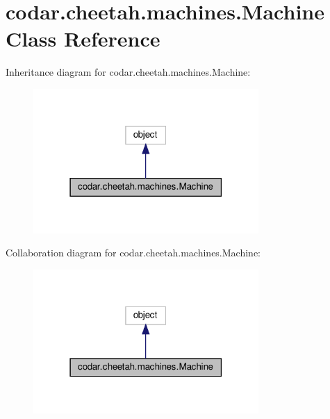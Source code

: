 \hypertarget{classcodar_1_1cheetah_1_1machines_1_1_machine}{}\section{codar.\+cheetah.\+machines.\+Machine Class Reference}
\label{classcodar_1_1cheetah_1_1machines_1_1_machine}


Inheritance diagram for codar.\+cheetah.\+machines.\+Machine\+:
\nopagebreak
\begin{figure}[H]
\begin{center}
\leavevmode
\includegraphics[width=243pt]{classcodar_1_1cheetah_1_1machines_1_1_machine__inherit__graph}
\end{center}
\end{figure}


Collaboration diagram for codar.\+cheetah.\+machines.\+Machine\+:
\nopagebreak
\begin{figure}[H]
\begin{center}
\leavevmode
\includegraphics[width=243pt]{classcodar_1_1cheetah_1_1machines_1_1_machine__coll__graph}
\end{center}
\end{figure}
